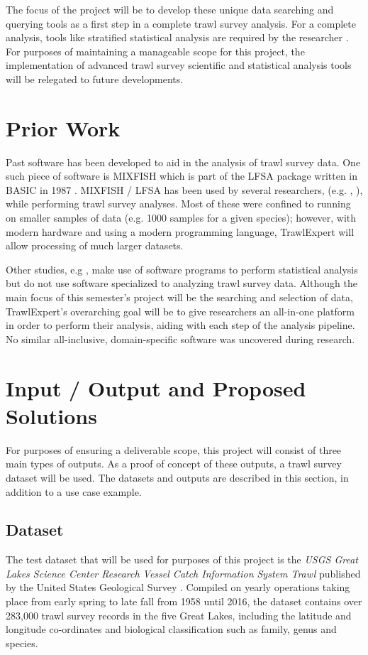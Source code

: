\documentclass{article}
\begin{document}
The focus of the project will be to develop these unique data searching and querying tools as a first step in a complete trawl survey analysis. For a complete analysis, tools like stratified statistical analysis are required by the researcher \citep{walsh1997efficiency}. For purposes of maintaining a manageable scope for this project, the implementation of advanced trawl survey scientific and statistical analysis tools will be relegated to future developments. 

\section{Prior Work}
Past software has been developed to aid in the analysis of trawl survey data. One such piece of software is MIXFISH which is part of the LFSA package written in BASIC in 1987 \citep{sparre1987computer}. MIXFISH / LFSA has been used by several researchers, (e.g. \citeauthor{levi1993analysis}, \citeauthor{chakraborty1996stock}), while performing trawl survey analyses. Most of these were confined to running on smaller samples of data (e.g. 1000 samples for a given species); however, with modern hardware and using a modern programming language, TrawlExpert will allow processing of much larger datasets.

Other studies, e.g \cite{swartzman1992spatial}, make use of software programs to perform statistical analysis but do not use software specialized to analyzing trawl survey data. Although the main focus of this semester's project will be the searching and selection of data, TrawlExpert's overarching goal will be to give researchers an all-in-one platform in order to perform their analysis, aiding with each step of the analysis pipeline. No similar all-inclusive, domain-specific software was uncovered during research.

\section{Input / Output and Proposed Solutions}
For purposes of ensuring a deliverable scope, this project will consist of three main types of outputs. As a proof of concept of these outputs, a trawl survey dataset will be used. The datasets and outputs are described in this section, in addition to a use case example.

\subsection{Dataset}\label{sec:out}
The test dataset that will be used for purposes of this project is the \textit{USGS Great Lakes Science Center Research Vessel Catch Information System Trawl} published by the United States Geological Survey \citep{usgs2018}. Compiled on yearly operations taking place from early spring to late fall from 1958 until 2016, the dataset contains over 283,000 trawl survey records in the five Great Lakes, including the latitude and longitude co-ordinates and biological classification such as family, genus and species.
\end{document}
